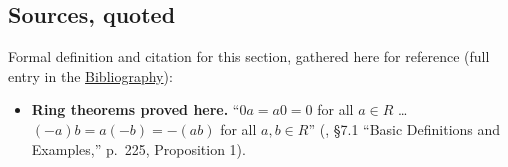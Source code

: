 \subsection{Sources, quoted}\label{sec:10-ring-theorems:01-setup:2}

Formal definition and citation for this section, gathered here for reference (full entry in the \hyperref[sec:root:bibliography:1]{Bibliography}):

\begin{itemize}
\tightlist
\item
  \textbf{Ring theorems proved here.} ``\(0a = a0 = 0\) for all \(a \in R\) \ldots{} \((-a)b = a(-b) = -(ab)\) for all \(a, b \in R\)'' (\cite{DummitFoote2003}, §7.1 ``Basic Definitions and Examples,'' p.~225, Proposition 1).
\end{itemize}
